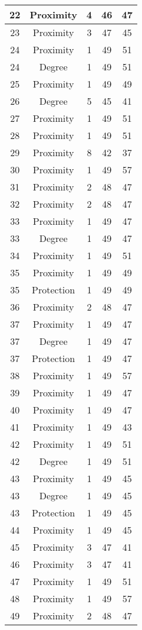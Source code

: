 \documentclass[results.tex]{subfiles}
\begin{document}
\begin{center}
\begin{tabular}{| c || c | c | c | c |}
    \hline
    22 & Proximity & 4 & 46 & 47 \\ 
    \hline
    23 & Proximity & 3 & 47 & 45 \\ 
    \hline
    24 & Proximity & 1 & 49 & 51 \\ 
    \hline
    24 & Degree & 1 & 49 & 51 \\ 
    \hline
    25 & Proximity & 1 & 49 & 49 \\ 
    \hline
    26 & Degree & 5 & 45 & 41 \\ 
    \hline
    27 & Proximity & 1 & 49 & 51 \\ 
    \hline
    28 & Proximity & 1 & 49 & 51 \\ 
    \hline
    29 & Proximity & 8 & 42 & 37 \\ 
    \hline
    30 & Proximity & 1 & 49 & 57 \\ 
    \hline
    31 & Proximity & 2 & 48 & 47 \\ 
    \hline
    32 & Proximity & 2 & 48 & 47 \\ 
    \hline
    33 & Proximity & 1 & 49 & 47 \\ 
    \hline
    33 & Degree & 1 & 49 & 47 \\ 
    \hline
    34 & Proximity & 1 & 49 & 51 \\ 
    \hline
    35 & Proximity & 1 & 49 & 49 \\ 
    \hline
    35 & Protection & 1 & 49 & 49 \\ 
    \hline
    36 & Proximity & 2 & 48 & 47 \\ 
    \hline
    37 & Proximity & 1 & 49 & 47 \\ 
    \hline
    37 & Degree & 1 & 49 & 47 \\ 
    \hline
    37 & Protection & 1 & 49 & 47 \\ 
    \hline
    38 & Proximity & 1 & 49 & 57 \\ 
    \hline
    39 & Proximity & 1 & 49 & 47 \\ 
    \hline
    40 & Proximity & 1 & 49 & 47 \\ 
    \hline
    41 & Proximity & 1 & 49 & 43 \\ 
    \hline
    42 & Proximity & 1 & 49 & 51 \\ 
    \hline
    42 & Degree & 1 & 49 & 51 \\ 
    \hline
    43 & Proximity & 1 & 49 & 45 \\ 
    \hline
    43 & Degree & 1 & 49 & 45 \\ 
    \hline
    43 & Protection & 1 & 49 & 45 \\ 
    \hline
    44 & Proximity & 1 & 49 & 45 \\ 
    \hline
    45 & Proximity & 3 & 47 & 41 \\ 
    \hline
    46 & Proximity & 3 & 47 & 41 \\ 
    \hline
    47 & Proximity & 1 & 49 & 51 \\ 
    \hline
    48 & Proximity & 1 & 49 & 57 \\ 
    \hline
    49 & Proximity & 2 & 48 & 47 \\ 
    \hline   \end{tabular}
\end{center}
\end{document}
